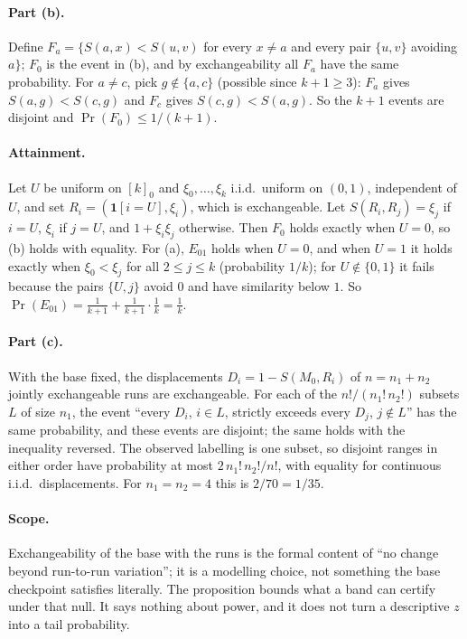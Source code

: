 \documentclass{article}
\begin{document}
\paragraph{Part (b).} Define $F_a=\{S(a,x)<S(u,v)$ for every $x\ne a$ and every pair $\{u,v\}$ avoiding $a\}$; $F_0$ is the event in (b), and by exchangeability all $F_a$ have the same probability. For $a\ne c$, pick $g\notin\{a,c\}$ (possible since $k+1\ge3$): $F_a$ gives $S(a,g)<S(c,g)$ and $F_c$ gives $S(c,g)<S(a,g)$. So the $k+1$ events are disjoint and $\Pr(F_0)\le1/(k+1)$.

\paragraph{Attainment.} Let $U$ be uniform on $[k]_0$ and $\xi_0,\dots,\xi_k$ i.i.d.\ uniform on $(0,1)$, independent of $U$, and set $R_i=(\mathbf 1[i=U],\xi_i)$, which is exchangeable. Let $S(R_i,R_j)=\xi_j$ if $i=U$, $\xi_i$ if $j=U$, and $1+\xi_i\xi_j$ otherwise. Then $F_0$ holds exactly when $U=0$, so (b) holds with equality. For (a), $E_{01}$ holds when $U=0$, and when $U=1$ it holds exactly when $\xi_0<\xi_j$ for all $2\le j\le k$ (probability $1/k$); for $U\notin\{0,1\}$ it fails because the pairs $\{U,j\}$ avoid $0$ and have similarity below $1$. So $\Pr(E_{01})=\frac1{k+1}+\frac1{k+1}\cdot\frac1k=\frac1k$.

\paragraph{Part (c).} With the base fixed, the displacements $D_i=1-S(M_0,R_i)$ of $n=n_1+n_2$ jointly exchangeable runs are exchangeable. For each of the $n!/(n_1!\,n_2!)$ subsets $L$ of size $n_1$, the event ``every $D_i$, $i\in L$, strictly exceeds every $D_j$, $j\notin L$'' has the same probability, and these events are disjoint; the same holds with the inequality reversed. The observed labelling is one subset, so disjoint ranges in either order have probability at most $2\,n_1!\,n_2!/n!$, with equality for continuous i.i.d.\ displacements. For $n_1=n_2=4$ this is $2/70=1/35$.

\paragraph{Scope.} Exchangeability of the base with the runs is the formal content of ``no change beyond run-to-run variation''; it is a modelling choice, not something the base checkpoint satisfies literally. The proposition bounds what a band can certify under that null. It says nothing about power, and it does not turn a descriptive $z$ into a tail probability.
\end{document}
